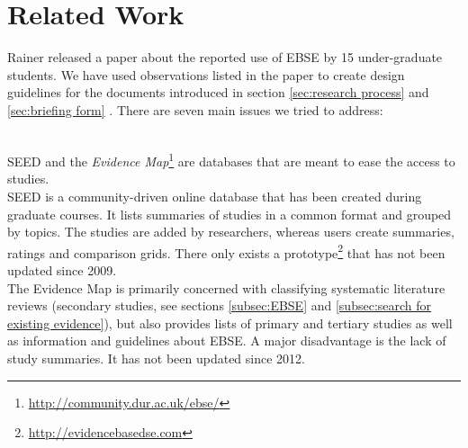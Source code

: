 
\section{Related Work}
\label{sec:related work}

Rainer \etal \cite{Rainer2006} released a paper about the reported use of EBSE by 15 under-graduate students. 
We have used observations listed in the paper to create design guidelines for the documents introduced in section \ref{sec:research process} and \ref{sec:briefing form} . There are seven main issues we tried to address:


\\

SEED and the \emph{Evidence Map}\footnote{\url{http://community.dur.ac.uk/ebse/}}  are databases that are meant to ease the access to studies.\\ 
SEED is a community-driven online database that has been created during graduate courses. It lists summaries of studies in a common format and grouped by topics. The studies are added by researchers, whereas users create summaries, ratings and comparison grids. There only exists a prototype\footnote{\url{http://evidencebasedse.com}} that has not been updated since 2009.\\
The Evidence Map is primarily concerned with  classifying systematic literature reviews (secondary studies, see sections \ref{subsec:EBSE} and \ref{subsec:search for existing evidence}), but also provides lists of primary and tertiary studies as well as information and guidelines about EBSE. A major disadvantage is the lack of study summaries. It has not been updated since 2012.

 \cite{Rainer2008}
